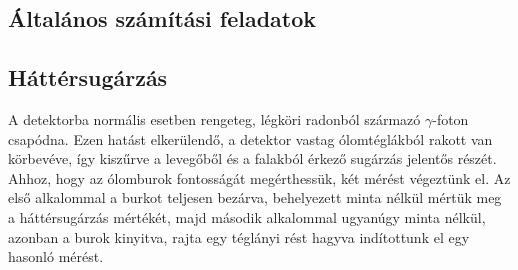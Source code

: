 \begin{multicols}{2}
\section{Általános számítási feladatok}
\subsection{Háttérsugárzás}
A detektorba normális esetben rengeteg, légköri radonból származó $\gamma$-foton csapódna. Ezen hatást elkerülendő, a detektor vastag ólomtéglákból rakott  van körbevéve, így kiszűrve a levegőből  és a falakból érkező sugárzás jelentős részét. Ahhoz, hogy az ólomburok fontosságát megérthessük, két mérést végeztünk el. Az első alkalommal a burkot teljesen bezárva, behelyezett minta nélkül mértük meg a háttérsugárzás mértékét, majd második alkalommal ugyanúgy minta nélkül, azonban a burok  kinyitva, rajta egy téglányi rést hagyva indítottunk el egy hasonló mérést.

\end{multicols}